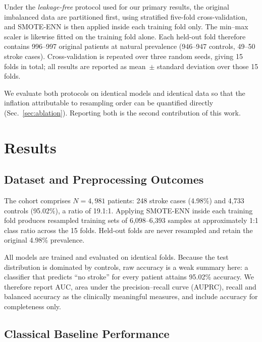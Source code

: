 \documentclass{ws-ijqi}
\begin{document}
Under the \emph{leakage-free} protocol used for our primary results, the
original imbalanced data are partitioned first, using stratified five-fold
cross-validation, and SMOTE-ENN is then applied inside each training fold only.
The min--max scaler is likewise fitted on the training fold alone. Each held-out
fold therefore contains 996--997 original patients at natural prevalence
(946--947 controls, 49--50 stroke cases). Cross-validation is repeated over
three random seeds, giving 15 folds in total; all results are reported as
mean~$\pm$ standard deviation over those 15 folds.

We evaluate both protocols on identical models and identical data so that the
inflation attributable to resampling order can be quantified directly
(Sec.~\ref{sec:ablation}). Reporting both is the second contribution of this
work.

\section{Results}
\label{sec:results}

\subsection{Dataset and Preprocessing Outcomes}
\label{sec:preproc}

The cohort comprises $N=4{,}981$ patients: 248 stroke cases (4.98\%) and 4,733
controls (95.02\%), a ratio of 19.1:1. Applying SMOTE-ENN inside each training
fold produces resampled training sets of 6,098--6,393 samples at approximately
1:1 class ratio across the 15 folds. Held-out folds are never resampled and
retain the original 4.98\% prevalence.

All models are trained and evaluated on identical folds. Because the test
distribution is dominated by controls, raw accuracy is a weak summary here: a
classifier that predicts ``no stroke'' for every patient attains 95.02\%
accuracy. We therefore report AUC, area under the precision--recall curve
(AUPRC), recall and balanced accuracy as the clinically meaningful measures,
and include accuracy for completeness only.

\subsection{Classical Baseline Performance}
\label{sec:classical}
\end{document}
